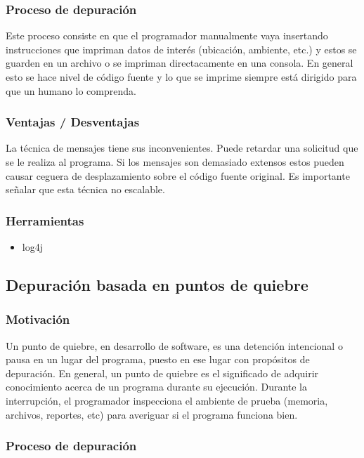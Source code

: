 \documentclass[12pt,a4paper]{report}
\begin{document}
			\subsubsection{Proceso de depuración}

Este proceso consiste en que el programador manualmente vaya insertando instrucciones que impriman datos de interés (ubicación, ambiente, etc.) y estos se guarden en un archivo o se impriman directacamente en una consola.  En general esto se hace nivel de código fuente y lo que se imprime siempre está dirigido para que un humano lo comprenda.

			\subsubsection{Ventajas / Desventajas}

La técnica de mensajes tiene sus inconvenientes. Puede retardar una solicitud que se le realiza al programa. Si los mensajes son demasiado extensos estos pueden causar ceguera de desplazamiento sobre el código fuente original.  Es importante señalar que esta técnica no escalable.  


			\subsubsection{Herramientas}
\begin{itemize}
	\item log4j
\end{itemize}

		\subsection{Depuración basada en puntos de quiebre}
			\subsubsection{Motivación}

Un punto de quiebre, en desarrollo de software, es una detención intencional o pausa en un lugar del programa, puesto en ese lugar con propósitos de depuración.  En general, un punto de quiebre es el significado de adquirir conocimiento acerca de un programa durante su ejecución.  Durante la interrupción, el programador inspecciona el ambiente de prueba (memoria, archivos, reportes, etc) para averiguar si el programa funciona bien.

			\subsubsection{Proceso de depuración}
\end{document}
